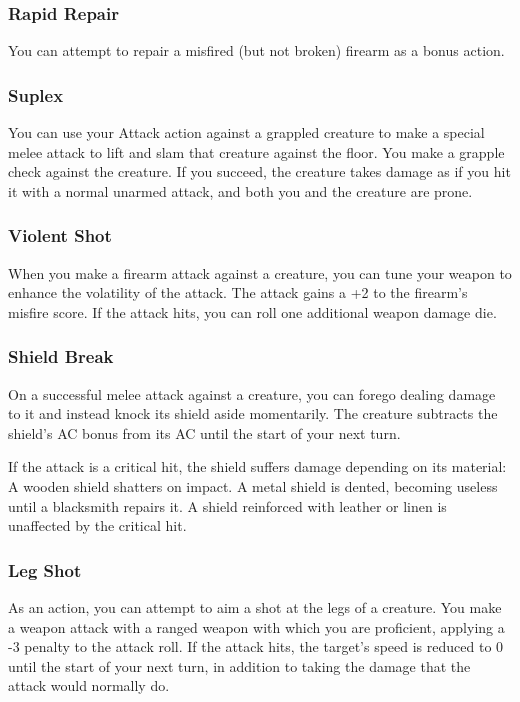 \subsubsection{Rapid Repair} \label{tec::rapidrepair}
You can attempt to repair a misfired (but not broken) firearm as a bonus action.

\subsubsection{Suplex} \label{tec::suplex}
You can use your Attack action against a grappled creature to make a special melee attack to lift and slam that creature against the floor.
You make a grapple check against the creature.
If you succeed, the creature takes damage as if you hit it with a normal unarmed attack, and both you and the creature are prone.

\subsubsection{Violent Shot} \label{tec::violentshot}
When you make a firearm attack against a creature, you can tune your weapon to enhance the volatility of the attack.
The attack gains a +2 to the firearm's misfire score.
If the attack hits, you can roll one additional weapon damage die.

\subsubsection{Shield Break} \label{tec::shieldbreak}
On a successful melee attack against a creature, you can forego dealing damage to it and instead knock its shield aside momentarily.
The creature subtracts the shield's AC bonus from its AC until the start of your next turn.

If the attack is a critical hit, the shield suffers damage depending on its material:
A wooden shield shatters on impact.
A metal shield is dented, becoming useless until a blacksmith repairs it.
A shield reinforced with leather or linen is unaffected by the critical hit.

\subsubsection{Leg Shot} \label{tec::legshot}
As an action, you can attempt to aim a shot at the legs of a creature.
You make a weapon attack with a ranged weapon with which you are proficient, applying a -3 penalty to the attack roll.
If the attack hits, the target's speed is reduced to 0 until the start of your next turn, in addition to taking the damage that the attack would normally do.

